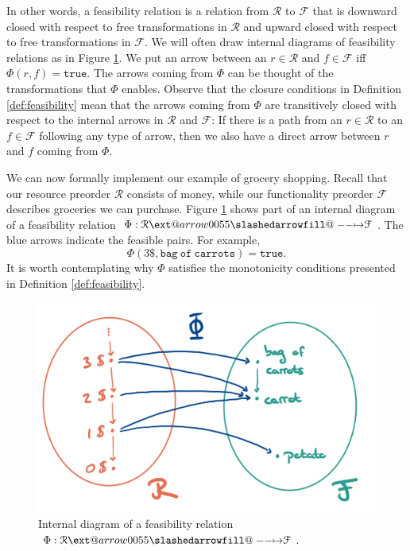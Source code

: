 \documentclass[12pt]{article}
\makeatletter
\theoremstyle{definition}
\theoremstyle{plain}
\theoremstyle{plain}
\theoremstyle{plain}
\theoremstyle{plain}
\theoremstyle{remark}
\newcommand{\continuation}{??}
\newenvironment{continueexample}[1]
{\renewcommand{\continuation}{\ref{#1}}\excont[continued]}
{\endexcont}
\theoremstyle{remark}
\newcommand{\mc}[1]{\mathcal{#1}}
\newcommand{\true}{\mathtt{true}}
\def\slashedarrowfill@#1#2#3#4#5{%
	$\m@th\thickmuskip0mu\medmuskip\thickmuskip\thinmuskip\thickmuskip
	\relax#5#1\mkern-7mu%
	\cleaders\hbox{$#5\mkern-2mu#2\mkern-2mu$}\hfill
	\mathclap{#3}\mathclap{#2}%
	\cleaders\hbox{$#5\mkern-2mu#2\mkern-2mu$}\hfill
	\mkern-7mu#4$%
}
\def\rightslashedarrowfill@{%
	\slashedarrowfill@\relbar\relbar\mapstochar\rightarrow}
\newcommand\xslashedrightarrow[2][]{%
	\ext@arrow 0055{\rightslashedarrowfill@}{#1}{#2}}
\makeatother
\begin{document}
In other words, a feasibility relation is a relation from $\mc{R}$ to $\mc{F}$ that is downward closed with respect to free transformations in $\mc{R}$ and upward closed with respect to free transformations in $\mc{F}$. We will often draw internal diagrams of feasibility relations as in Figure \ref{fig:internal feas}. We put an arrow between an $r \in \mc{R}$ and $f \in \mc{F}$ iff $\Phi(r,f) = \true$. The arrows coming from $\Phi$ can be thought of the transformations that $\Phi$ enables. Observe that the closure conditions in Definition \ref{def:feasibility} mean that the arrows coming from $\Phi$ are transitively closed with respect to the internal arrows in $\mc{R}$ and $\mc{F}$: If there is a path from an $r \in \mc{R}$ to an $f \in \mc{F}$ following any type of arrow, then we also have a direct arrow between $r$ and $f$ coming from $\Phi$.

\begin{continueexample}{ex:groceries}
	We can now formally implement our example of grocery shopping. Recall that our resource preorder $\mc{R}$ consists of money, while our functionality preorder $\mc{F}$ describes groceries we can purchase. Figure \ref{fig:internal feas} shows part of an internal diagram of a feasibility relation $\Phi: \mc{R} \xslashedrightarrow{} \mc{F}$. The blue arrows indicate the feasible pairs. For example, $$\Phi(3\$,\mathtt{bag\ of\ carrots}) = \true.$$ It is worth contemplating why $\Phi$ satisfies the monotonicity conditions presented in Definition \ref{def:feasibility}.
	
	\begin{figure}
		\centering
		\includegraphics[width=350pt]{images/ex_groceries}
		\caption{Internal diagram of a feasibility relation $\Phi: \mc{R} \xslashedrightarrow{} \mc{F}$.}
		\label{fig:internal feas}
	\end{figure}
	
\end{continueexample}
\end{document}
